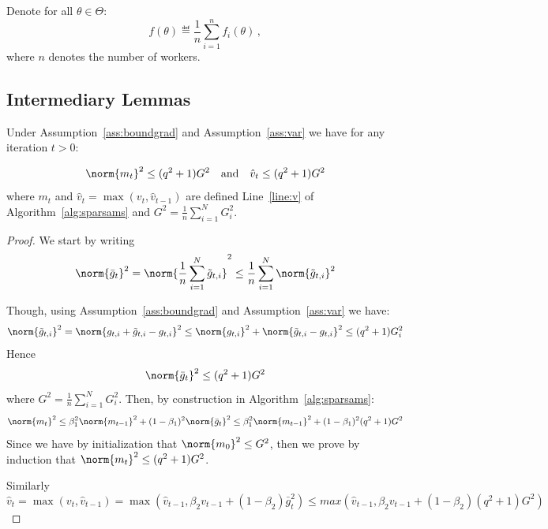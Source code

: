\documentclass[11pt]{article}
\begin{document}
Denote for all $\theta \in \Theta$:
\begin{equation}\label{eq:obj}
f(\theta) \eqdef  \frac{1}{n} \sum_{i=1}^n f_i(\theta) \, ,
\end{equation} 
where $n$ denotes the number of workers.



\subsection{Intermediary Lemmas}
\begin{Lemma}\label{lem:bound}
Under Assumption~\ref{ass:boundgrad} and Assumption~\ref{ass:var} we have for any iteration $t >0$:

\begin{equation}
\norm{m_t}^2 \leq (q^2+1) G^2 \quad \textrm{and} \quad \hat v_t \leq (q^2+1) G^2
\end{equation}
where $m_t$ and $\hat v_t=\max(v_t,\hat v_{t-1})$ are defined Line~\ref{line:v} of Algorithm~\ref{alg:sparsams} and $G^2 = \frac{1}{n}\sum_{i=1}^N  G_{i}^2$.
\end{Lemma}

\begin{proof}
We start by writing
\begin{equation}
\norm{\bar g_t}^2  = \norm{\frac{1}{n}\sum_{i=1}^N \tilde g_{t,i} }^2 \leq \frac{1}{n}\sum_{i=1}^N \norm{\tilde g_{t,i} }^2
\end{equation}

Though, using Assumption~\ref{ass:boundgrad} and Assumption~\ref{ass:var} we have:
\begin{equation}
\norm{\tilde g_{t,i} }^2  = \norm{g_{t,i}  + \tilde g_{t,i}  - g_{t,i}}^2 \leq \norm{g_{t,i} }^2 + \norm{\tilde g_{t,i}  - g_{t,i}}^2 \leq (q^2+1)G_i^2
\end{equation}
Hence
\begin{equation}
\norm{\bar g_t}^2  \leq (q^2+1) G^2
\end{equation}
where $G^2 = \frac{1}{n}\sum_{i=1}^N  G_{i}^2$.
Then, by construction in Algorithm~\ref{alg:sparsams}:
\begin{equation}
\norm{m_t}^2  \leq \beta_1^2 \norm{m_{t-1}}^2 + (1 - \beta_1)^2 \norm{\bar g_t}^2  \leq \beta_1^2 \norm{m_{t-1}}^2 + (1 - \beta_1)^2(q^2+1) G^2
\end{equation}
Since we have by initialization that $\norm{m_0}^2 \leq G^2$, then we prove by induction that $\norm{m_t}^2 \leq (q^2+1) G^2$.

Similarly
\begin{equation}
\hat v_t = \max(v_t,\hat v_{t-1}) = \max(\hat v_{t-1}, \beta_2 v_{t-1}+(1-\beta_2)\bar g_t^2) \leq  max(\hat v_{t-1}, \beta_2 v_{t-1}+(1-\beta_2)(q^2+1) G^2) 
\end{equation}
\end{proof}
\end{document}
